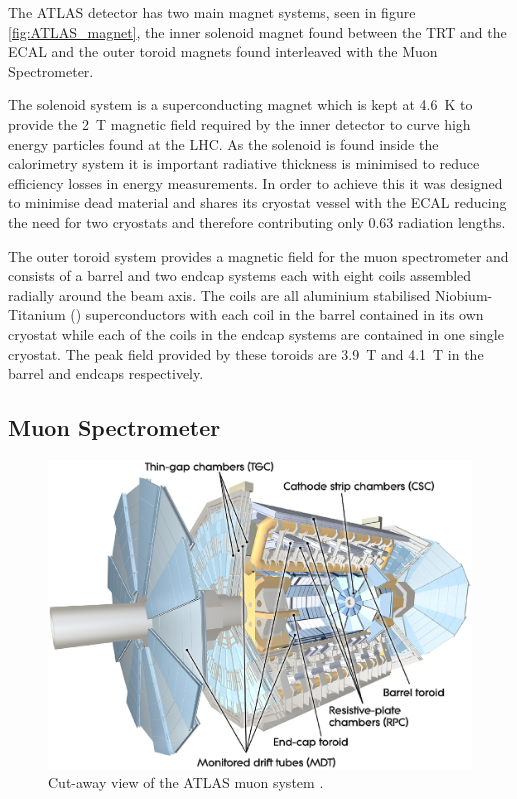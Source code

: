 		The ATLAS detector has two main magnet systems, seen in figure \ref{fig:ATLAS_magnet}, the inner solenoid magnet found between the TRT and the ECAL and the outer toroid magnets found interleaved with the Muon Spectrometer. 

		The solenoid system is a superconducting magnet which is kept at \SI{4.6}{\K} to provide the \SI{2}{T} magnetic field required by the inner detector to curve high energy particles found at the LHC. As the solenoid is found inside the calorimetry system it is important radiative thickness is minimised to reduce efficiency losses in energy measurements. In order to achieve this it was designed to minimise dead material and shares its cryostat vessel with the ECAL reducing the need for two cryostats and therefore contributing only 0.63 radiation lengths.

		The outer toroid system provides a magnetic field for the muon spectrometer and consists of a barrel and two endcap systems each with eight coils assembled radially around the beam axis. The coils are all aluminium stabilised Niobium-Titanium () superconductors with each coil in the barrel contained in its own cryostat while each of the coils in the endcap systems are contained in one single cryostat. The peak field provided by these toroids are \SI{3.9}{T} and \SI{4.1}{T} in the barrel and endcaps respectively.

	


	\subsection{Muon Spectrometer}

		\begin{figure}[h!]
			\begin{center}
				\includegraphics[width=0.95\linewidth]{images/MuonSystem_d3.eps}
			\end{center}
			\caption{ Cut-away view of the ATLAS muon system \cite{Aad:1129811}.}
			\label{fig:ATLAS_muon}
		\end{figure}

